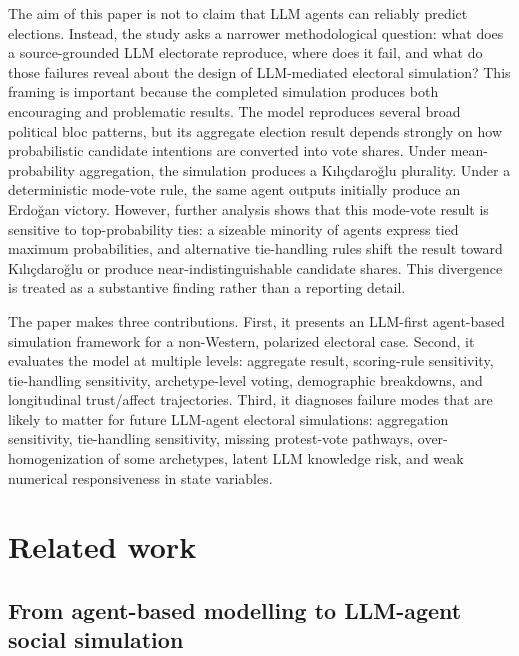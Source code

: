 \documentclass[pdflatex,sn-mathphys-num,iicol]{sn-jnl}
\begin{document}
The aim of this paper is not to claim that LLM agents can reliably predict elections. Instead, the study asks a narrower methodological question: what does a source-grounded LLM electorate reproduce, where does it fail, and what do those failures reveal about the design of LLM-mediated electoral simulation? This framing is important because the completed simulation produces both encouraging and problematic results. The model reproduces several broad political bloc patterns, but its aggregate election result depends strongly on how probabilistic candidate intentions are converted into vote shares. Under mean-probability aggregation, the simulation produces a Kılıçdaroğlu plurality. Under a deterministic mode-vote rule, the same agent outputs initially produce an Erdoğan victory. However, further analysis shows that this mode-vote result is sensitive to top-probability ties: a sizeable minority of agents express tied maximum probabilities, and alternative tie-handling rules shift the result toward Kılıçdaroğlu or produce near-indistinguishable candidate shares. This divergence is treated as a substantive finding rather than a reporting detail.

The paper makes three contributions. First, it presents an LLM-first agent-based simulation framework for a non-Western, polarized electoral case. Second, it evaluates the model at multiple levels: aggregate result, scoring-rule sensitivity, tie-handling sensitivity, archetype-level voting, demographic breakdowns, and longitudinal trust/affect trajectories. Third, it diagnoses failure modes that are likely to matter for future LLM-agent electoral simulations: aggregation sensitivity, tie-handling sensitivity, missing protest-vote pathways, over-homogenization of some archetypes, latent LLM knowledge risk, and weak numerical responsiveness in state variables.

\section{Related work}\label{sec:related}

\subsection{From agent-based modelling to LLM-agent social simulation}
\end{document}
